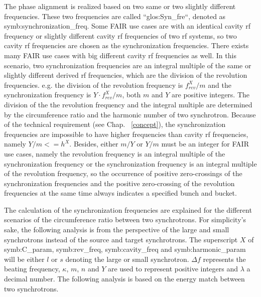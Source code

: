 The phase alignment is realized based on two same or two slightly different frequencies. These two frequencies are called ``\gls{glos:Syn_fre}``, denoted as \gls{symb:synchronization_freq}. Some FAIR use cases are with an identical cavity rf frequency or slightly different cavity rf frequencies of two rf systems, so two cavity rf frequencies are chosen as the synchronization frequencies. There exists many FAIR use cases with big different cavity rf frequencies as well. In this scenario, two synchronization frequencies are an integral multiple of the same or slightly different derived rf frequencies, which are the division of the revolution frequencies. e.g. the division of the revolution frequency is $f_\mathit{rev}^{X}/m$ and the synchronization frequency is $Y\cdot f_\mathit{rev}^{X}/m$, both $m$ and $Y$ are positive integers. The division of the the revolution frequency and the integral multiple are determined by the circumference ratio and the harmonic number of two synchrotron. Because of the technical requirement (see Chap. ~\ref{concept}), the synchronization frequencies are impossible to have higher frequencies than cavity rf frequencies, namely $Y/m <=h^X$. Besides, either $m/Y$ or $Y/m$ must be an integer for FAIR use cases, namely the revolution frequency is an integral multiple of the synchronization frequency or the synchronization frequency is an integral multiple of the revolution frequency, so the occurrence of positive zero-crossings of the synchronization frequencies and the positive zero-crossing of the revolution frequencies at the same time always indicates a specified bunch and bucket.

The calculation of the synchronization frequencies are explained for the different scenarios of the circumference ratio between two synchrotrons. For simplicity's sake, the following analysis is from the perspective of the large and small synchrotrons instead of the source and target synchrotrons. The superscript $X$ of \gls{symb:C_param}, \gls{symb:rev_freq}, \gls{symb:cavity_freq} and \gls{symb:harmonic_param} will be either $l$ or $s$ denoting the large or small synchrotron. $\Delta f$ represents the beating frequency, $\kappa$, $m$, $n$ and $Y$ are used to represent positive integers and $\lambda$ a decimal number. The following analysis is based on the energy match between two synchrotrons.

